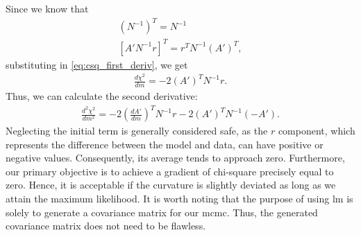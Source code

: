 \documentclass[%
 reprint,
 amsmath,amssymb,
 aps,
]{revtex4-2}
\begin{document}
Since we know that 
\begin{gather}
    \left(N^{-1}\right)^T = N^{-1}\\
    \left[A' N^{-1} r\right]^T = r^T N^{-1} \left(A'\right)^T,
\end{gather}
substituting in \ref{eq:csq_first_deriv}, we get
\begin{align}
    \frac{d \chi^2}{dm} = -2 \left(A'\right)^T N^{-1} r.
\end{align}
Thus, we can calculate the second derivative:
\begin{align}
    \frac{d^2 \chi^2}{dm^2} = -2 \left(\frac{dA'}{dm}\right)^T N^{-1} r -2 \left(A'\right) ^T N^{-1} \left(-A'\right).
\end{align}
Neglecting the initial term is generally considered safe, as the $r$ component, which represents the difference between the model and data, can have positive or negative values. Consequently, its average tends to approach zero. Furthermore, our primary objective is to achieve a gradient of chi-square precisely equal to zero. Hence, it is acceptable if the curvature is slightly deviated as long as we attain the maximum likelihood. It is worth noting that the purpose of using \gls{lm} is solely to generate a covariance matrix for our \gls{mcmc}. Thus, the generated covariance matrix does not need to be flawless.
\end{document}
